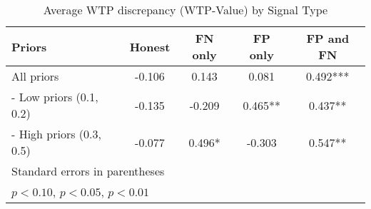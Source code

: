 \begin{table}[H]\centering \caption{Average WTP discrepancy (WTP-Value) by Signal Type} \label{tab:WTP_nonpar}
\begin{tabular}{lcccc} 
\hline \hline
\textbf{Priors}&\textbf{Honest}&\textbf{FN only}& \textbf{FP only} & \textbf{FP and FN}\\ \hline
All priors&-0.106&0.143&0.081&0.492***\\
\hspace{3pt}- Low priors (0.1, 0.2)&-0.135&-0.209&0.465**&0.437**\\
\hspace{3pt}- High priors (0.3, 0.5)&-0.077&0.496*&-0.303&0.547**\\
\hline
\multicolumn{5}{l}{\footnotesize Standard errors in parentheses}\\
\multicolumn{5}{l}{\footnotesize \sym{*} \(p<0.10\), \sym{**} \(p<0.05\), \sym{***} \(p<0.01\)}\\
\end{tabular} \end{table}
